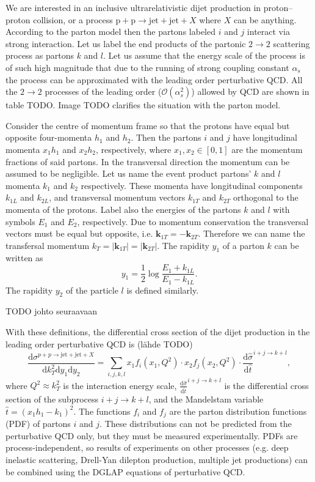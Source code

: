 \documentclass[a4paper, twoside, english, 12pt]{article}
\begin{document}
We are interested in an inclusive ultrarelativistic dijet production in proton--proton collision, or a process $\text{p}+\text{p}\rightarrow\text{jet}+\text{jet}+X$ where $X$ can be anything. According to the parton model then the partons labeled $i$ and $j$ interact via strong interaction. Let us label the end products of the partonic $2\rightarrow2$ scattering process as partons $k$ and $l$. Let us assume that the energy scale of the process is of such high magnitude that due to the running of strong coupling constant $\alpha_s$ the process can be approximated with the leading order perturbative QCD. All the $2\rightarrow2$ processes of the leading order ($\mathcal{O}(\alpha_s^2)$) allowed by QCD are shown in table TODO. Image TODO clarifies the situation with the parton model.

Consider the centre of momentum frame so that the protons have equal but opposite four-momenta $h_1$ and $h_2$. Then the partons $i$ and $j$ have longitudinal momenta $x_1h_1$ and $x_2h_2$, respectively, where $x_1,x_2\in {[0,1]}$ are the momentum fractions of said partons. In the transversal direction the momentum can be assumed to be negligible. Let us name the event product partons' $k$ and $l$ momenta $k_1$ and $k_2$ respectively. These momenta have longitudinal components $k_{1L}$ and $k_{2L}$, and transversal momentum vectors $k_{1T}$ and $k_{2T}$ orthogonal to the momenta of the protons. Label also the energies of the partons $k$ and $l$ with symbols $E_1$ and $E_2$, respectively. Due to momentum conservation the transversal vectors must be equal but opposite, i.e. $\mathbf{k}_{1T}=-\mathbf{k}_{2T}$. Therefore we can name the transfersal momentum $k_{T}=|\mathbf{k}_{1T}|=|\mathbf{k}_{2T}|$. The rapidity $y_1$ of a parton $k$ can be written as
\begin{equation}\label{E:rapidity}
y_1=\frac{1}{2}\log\frac{E_1+k_{1L}}{E_1-k_{1L}}.
\end{equation}
The rapidity $y_2$ of the particle $l$ is defined similarly.

TODO johto seuraavaan

With these definitions, the differential cross section of the dijet production in the leading order perturbative QCD is (lähde TODO)
\begin{equation}\label{E:dijet_cross_section}
\frac{\text{d}\sigma^{p+p\rightarrow\text{jet}+\text{jet}+X}}{\text{d}k_T^2\text{d}y_1\text{d}y_2} = \sum_{i,j,k,l} x_1f_i(x_1,Q^2)\cdot x_2f_j(x_2,Q^2) \cdot\frac{\text{d}\hat{\sigma}}{\text{d}\hat{t}}^{i+j\rightarrow k+l},
\end{equation}
where $Q^2\approx k_T^2$ is the interaction energy scale, $\frac{\text{d}\hat{\sigma}}{\text{d}\hat{t}}^{i+j\rightarrow k+l}$ is the differential cross section of the subprocess $i+j\rightarrow k+l$, and the Mandelstam variable $\hat{t} = (x_1h_1-k_1)^2$. The functions $f_i$ and $f_j$ are the parton distribution functions (PDF) of partons $i$ and $j$. These distributions can not be predicted from the perturbative QCD only, but they must be measured experimentally. PDFs are process-independent, so results of experiments on other processes (e.g. deep inelastic scattering, Drell-Yan dilepton production, multiple jet productions) can be combined using the DGLAP equations of perturbative QCD.
\end{document}
